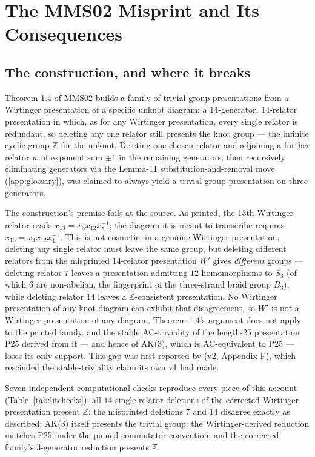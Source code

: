 \section{The MMS02 Misprint and Its Consequences}\label{app:misprint}

\subsection{The construction, and where it breaks}

Theorem 1.4 of MMS02 \cite{myasnikov2002ac} builds a family of trivial-group presentations
from a Wirtinger presentation of a specific unknot diagram: a $14$-generator, $14$-relator
presentation in which, as for any Wirtinger presentation, every single relator is
redundant, so deleting any one relator still presents the knot group --- the infinite cyclic
group $\mathbb{Z}$ for the unknot. Deleting one chosen relator and adjoining a further
relator $w$ of exponent sum $\pm1$ in the remaining generators, then recursively
eliminating generators via the Lemma-11 substitution-and-removal move (\ref{app:glossary}),
was claimed to always yield a trivial-group presentation on three generators.

The construction's premise fails at the source. As printed, the 13th Wirtinger relator
reads $x_{13}=x_5 x_{12} x_5^{-1}$; the diagram it is meant to transcribe requires
$x_{13}=x_4 x_{12} x_4^{-1}$. This is not cosmetic: in a genuine Wirtinger presentation,
deleting any single relator must leave the same group, but deleting different relators from
the misprinted $14$-relator presentation $W'$ gives \emph{different} groups --- deleting
relator $7$ leaves a presentation admitting $12$ homomorphisms to $S_3$ (of which $6$ are
non-abelian, the fingerprint of the three-strand braid group $B_3$), while deleting relator
$14$ leaves a $\mathbb{Z}$-consistent presentation. No Wirtinger presentation of any knot
diagram can exhibit that disagreement, so $W'$ is not a Wirtinger presentation of any
diagram, Theorem 1.4's argument does not apply to the printed family, and the stable
AC-triviality of the length-25 presentation P25 derived from it --- and hence of AK(3), which
is AC-equivalent to P25 --- loses its only support. This gap was first reported by
\cite{shehper2024hard} (v2, Appendix F), which rescinded the stable-triviality claim its own
v1 had made.

Seven independent computational checks reproduce every piece of this account
(Table~\ref{tab:litchecks}): all $14$ single-relator deletions of the corrected Wirtinger
presentation present $\mathbb{Z}$; the misprinted deletions $7$ and $14$ disagree exactly as
described; AK(3) itself presents the trivial group; the Wirtinger-derived reduction matches
P25 under the pinned commutator convention; and the corrected family's 3-generator
reduction presents $\mathbb{Z}$.

